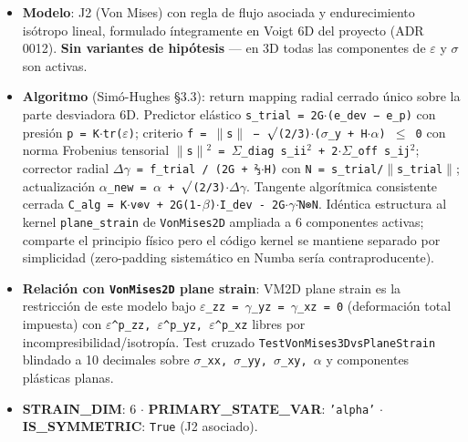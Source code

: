 \documentclass[11pt,letterpaper,oneside]{report}
\begin{document}
\begin{itemize}
  \item \textbf{Modelo}: J2 (Von Mises) con regla de flujo asociada y endurecimiento isótropo lineal, formulado íntegramente en Voigt 6D del proyecto (ADR 0012). \textbf{Sin variantes de hipótesis} --- en 3D todas las componentes de \texttt{\ensuremath{\varepsilon}} y \texttt{\ensuremath{\sigma}} son activas.
  \item \textbf{Algoritmo} (Simó-Hughes §3.3): return mapping radial cerrado único sobre la parte desviadora 6D. Predictor elástico \texttt{s\_trial = 2G\ensuremath{\cdot}(e\_dev − e\_p)} con presión \texttt{p = K\ensuremath{\cdot}tr(\ensuremath{\varepsilon})}; criterio \texttt{f = \ensuremath{\|}s\ensuremath{\|} − \ensuremath{\surd}(2/3)\ensuremath{\cdot}(\ensuremath{\sigma}\_y + H\ensuremath{\cdot}\ensuremath{\alpha}) \ensuremath{\le} 0} con norma Frobenius tensorial \texttt{\ensuremath{\|}s\ensuremath{\|}\ensuremath{^{2}} = \ensuremath{\Sigma}\_diag s\_ii\ensuremath{^{2}} + 2\ensuremath{\cdot}\ensuremath{\Sigma}\_off s\_ij\ensuremath{^{2}}}; corrector radial \texttt{\ensuremath{\Delta}\ensuremath{\gamma} = f\_trial / (2G + ⅔\ensuremath{\cdot}H)} con \texttt{N = s\_trial/\ensuremath{\|}s\_trial\ensuremath{\|}}; actualización \texttt{\ensuremath{\alpha}\_new = \ensuremath{\alpha} + \ensuremath{\surd}(2/3)\ensuremath{\cdot}\ensuremath{\Delta}\ensuremath{\gamma}}. Tangente algorítmica consistente cerrada \texttt{C\_alg = K\ensuremath{\cdot}v⊗v + 2G(1-\ensuremath{\beta})\ensuremath{\cdot}I\_dev - 2G\ensuremath{\cdot}\ensuremath{\gamma}̄\ensuremath{\cdot}N⊗N}. Idéntica estructura al kernel \texttt{plane\_strain} de \texttt{VonMises2D} ampliada a 6 componentes activas; comparte el principio físico pero el código kernel se mantiene separado por simplicidad (zero-padding sistemático en Numba sería contraproducente).
  \item \textbf{Relación con \texttt{VonMises2D} plane strain}: VM2D plane strain es la restricción de este modelo bajo \texttt{\ensuremath{\varepsilon}\_zz = \ensuremath{\gamma}\_yz = \ensuremath{\gamma}\_xz = 0} (deformación total impuesta) con \texttt{\ensuremath{\varepsilon}\textasciicircum{}p\_zz, \ensuremath{\varepsilon}\textasciicircum{}p\_yz, \ensuremath{\varepsilon}\textasciicircum{}p\_xz} libres por incompresibilidad/isotropía. Test cruzado \texttt{TestVonMises3DvsPlaneStrain} blindado a 10 decimales sobre \texttt{\ensuremath{\sigma}\_xx, \ensuremath{\sigma}\_yy, \ensuremath{\sigma}\_xy, \ensuremath{\alpha}} y componentes plásticas planas.
  \item \textbf{STRAIN\_DIM}: 6 \ensuremath{\cdot} \textbf{PRIMARY\_STATE\_VAR}: \texttt{'alpha'} \ensuremath{\cdot} \textbf{IS\_SYMMETRIC}: \texttt{True} (J2 asociado).

\end{itemize}
\end{document}
